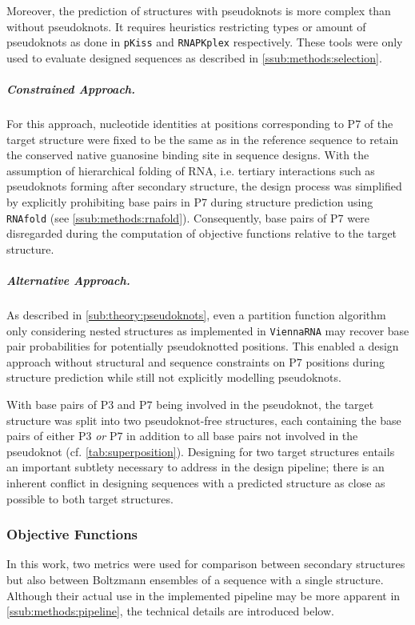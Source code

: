 \documentclass[../../master.tex]{subfiles}
\begin{document}
Moreover, the prediction of structures with pseudoknots is more complex than without pseudoknots. 
It requires heuristics restricting types or amount of pseudoknots as done in \texttt{pKiss} and \texttt{RNAPKplex} respectively.
These tools were only used to evaluate designed sequences as described in \autoref{ssub:methods:selection}.

\subparagraph{Constrained Approach.}
\label{spar:methods:constapproach}

For this approach, nucleotide identities at positions corresponding to P7 of the target structure were fixed to be the same as in the reference sequence to retain the conserved native guanosine binding site in sequence designs.
With the assumption of hierarchical folding of RNA, i.e. tertiary interactions such as pseudoknots forming after secondary structure, the design process was simplified by explicitly prohibiting base pairs in P7 during structure prediction using \texttt{RNAfold} (see \autoref{ssub:methods:rnafold}).
Consequently, base pairs of P7 were disregarded during the computation of objective functions relative to the target structure.

\subparagraph{Alternative Approach.}
\label{spar:methods:altapproach}

As described in \autoref{sub:theory:pseudoknots}, even a partition function algorithm only considering nested structures as implemented in \texttt{ViennaRNA} may recover base pair probabilities for potentially pseudoknotted positions.
This enabled a design approach without structural and sequence constraints on P7 positions during structure prediction while still not explicitly modelling pseudoknots.

With base pairs of P3 and P7 being involved in the pseudoknot, the target structure was split into two pseudoknot-free structures, each containing the base pairs of either P3 \emph{or} P7 in addition to all base pairs not involved in the pseudoknot (cf. \autoref{tab:superposition}).
Designing for two target structures entails an important subtlety necessary to address in the design pipeline; there is an inherent conflict in designing sequences with a predicted structure as close as possible to both target structures.


\subsubsection{Objective Functions}
\label{ssub:methods:objectives}

In this work, two metrics were used for comparison between secondary structures but also between Boltzmann ensembles of a sequence with a single structure.
Although their actual use in the implemented pipeline may be more apparent in \autoref{ssub:methods:pipeline}, the technical details are introduced below.
\end{document}
